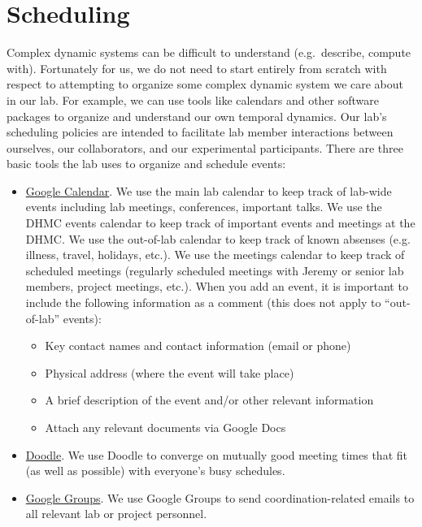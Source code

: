 \documentclass{tufte-book} %
\begin{document}
\section{Scheduling}
Complex dynamic systems can be difficult to understand (e.g.\
describe, compute with).  Fortunately for us, we do not need to start
entirely from scratch with respect to attempting to organize some
complex dynamic system we care about in our lab.  For example, we can
use tools like calendars and other software packages to organize and
understand our own temporal dynamics.  Our lab's scheduling policies
are intended to facilitate lab member interactions between ourselves,
our collaborators, and our experimental participants.  There are three
basic tools the lab uses to organize and schedule events:
\begin{itemize}
\item \href{http://calendar.google.com}{Google Calendar}.  We use the
  main lab calendar to keep track of lab-wide events including lab
  meetings, conferences, important talks.  We use the DHMC events
  calendar to keep track of important events and meetings at the
  DHMC.  We use the out-of-lab calendar to keep track of known
  absenses (e.g. illness, travel, holidays, etc.).  We use the
  meetings calendar to keep track of scheduled meetings (regularly
  scheduled meetings with Jeremy or senior lab members, project
  meetings, etc.).  When you add an event, it is important to include
  the following information as a comment (this does not apply to ``out-of-lab'' events):
\begin{itemize}
  \item Key contact names and contact information (email or phone)
  \item Physical address (where the event will take place)
  \item A brief description of the event and/or other relevant information
  \item Attach any relevant documents via Google Docs
\end{itemize}
\item \href{http://www.doodle.com}{Doodle}.  We use Doodle to converge
  on mutually good meeting times that fit (as well as possible) with
  everyone's busy schedules.
\item \href{http://www.groups.google.com}{Google Groups}.  We use
  Google Groups to send coordination-related emails to all relevant
  lab or project personnel.
\end{itemize}
\end{document}
